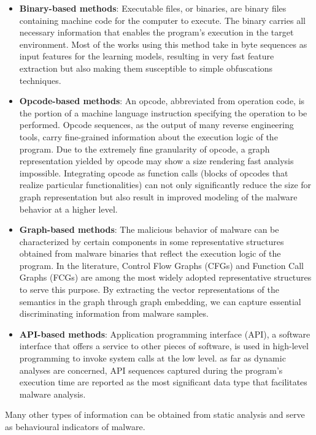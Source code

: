 \begin{itemize}
    \item \textbf{Binary-based methods}: Executable files, or binaries, are binary files containing machine code for the computer to execute. The binary carries all necessary information that enables the program’s execution in the target environment. Most of the works using this method take in byte sequences as input features for the learning models, resulting in very fast feature extraction but also making them susceptible to simple obfuscations techniques.
    \item \textbf{Opcode-based methods}: An opcode, abbreviated from operation code, is the portion of a machine language instruction specifying the operation to be performed. Opcode sequences, as the output of many reverse engineering tools, carry fine-grained information about the execution logic of the program. Due to the extremely fine granularity of opcode, a graph representation yielded by opcode may show a size rendering fast analysis impossible. Integrating opcode as function calls (blocks of opcodes that realize particular functionalities) can not only significantly reduce the size for graph representation but also result in improved modeling of the malware behavior at a higher level.
    \item \textbf{Graph-based methods}: The malicious behavior of malware can be characterized by certain components in some representative structures obtained from malware binaries that reflect the execution logic of the program. In the literature, Control Flow Graphs (CFGs) and Function Call Graphs (FCGs) are among the most widely adopted representative structures to serve this purpose. By extracting the vector representations of the semantics in the graph through graph embedding, we can capture essential discriminating information from malware samples.
    \item \textbf{API-based methods}: Application programming interface (API), a software interface that offers a service to other pieces of software, is used in high-level programming to invoke system calls at the low level. as far as dynamic analyses are concerned, API sequences captured during the program’s execution time are reported as the most significant data type that facilitates malware analysis.
\end{itemize}

\noindent Many other types of information can be obtained from static analysis and serve as behavioural indicators of malware.